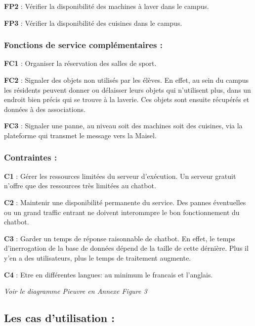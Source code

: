 \documentclass[12pt]{report}
\begin{document}
\textbf{FP2} : Vérifier la disponibilité des machines à laver dans le campus.

\textbf{FP3} : Vérifier la disponibilité des cuisines dans le campus.
\subsubsection{Fonctions de service complémentaires : }
\textbf{FC1} : Organiser la réservation des salles de sport.

\textbf{FC2} : Signaler des objets non utilisés par les élèves. En effet, au sein du campus les résidents peuvent donner ou délaisser leurs objets qui n'utilisent plus, dans un endroit bien précis qui se trouve à la laverie. Ces objets sont ensuite récupérés et données à des associations.

\textbf{FC3} : Signaler une panne, au niveau soit des machines soit des cuisines, via la plateforme qui transmet le message vers la Maisel.
\subsubsection{Contraintes : }

\textbf{C1} : Gérer les ressources limitées du serveur d'exécution. Un serveur gratuit n'offre que des ressources très limitées au chatbot.

\textbf{C2} : Maintenir une disponibilité permanente du service. Des pannes éventuelles ou un grand traffic entrant ne doivent interommpre le bon fonctionnement du chatbot.

\textbf{C3} : Garder un temps de réponse raisonnable de chatbot. En effet, le temps d'inerrogation de la base de données dépend de la taille de cette dérnière. Plus il y'en a des utilisateurs, plus le temps de traitement augmente.

\textbf{C4} : Etre en différentes langues: au minimum le francais et l'anglais.

\medbreak
\textit{Voir le diagramme Pieuvre en Annexe Figure 3}
\subsection{Les cas d’utilisation : }
\end{document}
